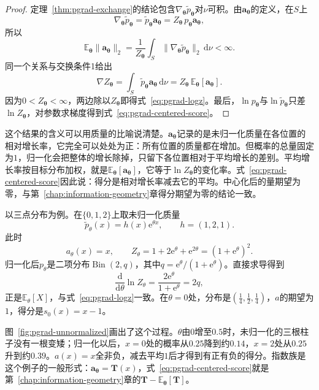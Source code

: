 \begin{proof}
定理~\ref{thm:pgrad-exchange}的结论包含$\nabla_{\bm{\theta}}\widetilde{p}_{\bm{\theta}}$对$\nu$可积。由$\bm{a}_{\bm{\theta}}$的定义，在$S$上
\[
  \nabla_{\bm{\theta}}\widetilde{p}_{\bm{\theta}}=\widetilde{p}_{\bm{\theta}}\bm{a}_{\bm{\theta}}=Z_{\bm{\theta}}\,p_{\bm{\theta}}\bm{a}_{\bm{\theta}},
\]
所以
\[
  \mathbb{E}_{\bm{\theta}}\lVert\bm{a}_{\bm{\theta}}\rVert_{2}=\frac{1}{Z_{\bm{\theta}}}\int_{S}\lVert\nabla_{\bm{\theta}}\widetilde{p}_{\bm{\theta}}\rVert_{2}\,\mathrm{d}\nu<\infty .
\]
同一个关系与交换条件1给出
\[
  \nabla Z_{\bm{\theta}}=\int_{S}\widetilde{p}_{\bm{\theta}}\bm{a}_{\bm{\theta}}\,\mathrm{d}\nu=Z_{\bm{\theta}}\,\mathbb{E}_{\bm{\theta}}[\bm{a}_{\bm{\theta}}].
\]
因为$0<Z_{\bm{\theta}}<\infty$，两边除以$Z_{\bm{\theta}}$即得式~\eqref{eq:pgrad-logz}。最后，$\ln p_{\bm{\theta}}$与$\ln\widetilde{p}_{\bm{\theta}}$只差$\ln Z_{\bm{\theta}}$，对参数求梯度得到式~\eqref{eq:pgrad-centered-score}。
\end{proof}

这个结果的含义可以用质量的比喻说清楚。$\bm{a}_{\bm{\theta}}$记录的是未归一化质量在各位置的相对增长率，它完全可以处处为正：所有位置的质量都在增加。但概率的总量固定为$1$，归一化会把整体的增长除掉，只留下各位置相对于平均增长的差别。平均增长率按目标分布加权，就是$\mathbb{E}_{\bm{\theta}}[\bm{a}_{\bm{\theta}}]$，它等于$\ln Z_{\bm{\theta}}$的变化率。式~\eqref{eq:pgrad-centered-score}因此说：得分是相对增长率减去它的平均。中心化后的量期望为零，与第~\ref{chap:information-geometry}章得分期望为零的结论一致。

以三点分布为例。在$\{0,1,2\}$上取未归一化质量
\[
  \widetilde{p}_{\theta}(x)=h(x)\mathrm{e}^{\theta x},\qquad h=(1,2,1).
\]
此时
\[
  a_{\theta}(x)=x,\qquad Z_{\theta}=1+2\mathrm{e}^{\theta}+\mathrm{e}^{2\theta}=(1+\mathrm{e}^{\theta})^{2}.
\]
归一化后$p_{\theta}$是二项分布$\operatorname{Bin}(2,q)$，其中$q=\mathrm{e}^{\theta}/(1+\mathrm{e}^{\theta})$。直接求导得到
\[
  \frac{\mathrm{d}}{\mathrm{d}\theta}\ln Z_{\theta}=\frac{2\mathrm{e}^{\theta}}{1+\mathrm{e}^{\theta}}=2q,
\]
正是$\mathbb{E}_{\theta}[X]$，与式~\eqref{eq:pgrad-logz}一致。在$\theta=0$处，分布是$(\frac{1}{4},\frac{1}{2},\frac{1}{4})$，$a$的期望为$1$，得分是$s_{0}(x)=x-1$。

图~\ref{fig:pgrad-unnormalized}画出了这个过程。$\theta$由$0$增至$0.5$时，未归一化的三根柱子没有一根变矮；归一化以后，$x=0$处的概率从$0.25$降到约$0.14$，$x=2$处从$0.25$升到约$0.39$。$a(x)=x$全非负，减去平均$1$后才得到有正有负的得分。指数族是这个例子的一般形式：$\bm{a}_{\bm{\theta}}=\bm{T}(x)$，式~\eqref{eq:pgrad-centered-score}就是第~\ref{chap:information-geometry}章的$\bm{T}-\mathbb{E}_{\bm{\theta}}[\bm{T}]$。


